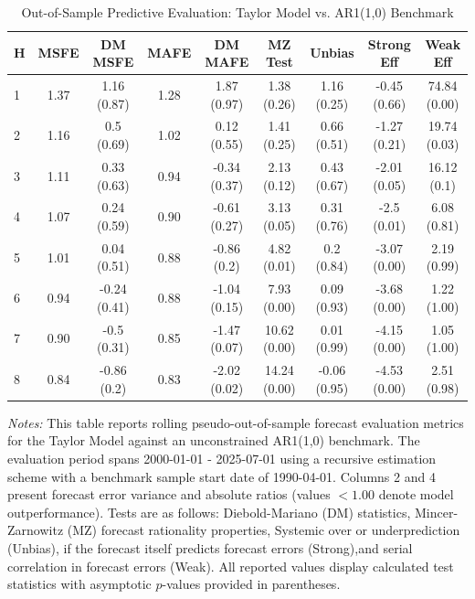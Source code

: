 \begin{table}[htbp]
\centering
\caption{Out-of-Sample Predictive Evaluation: Taylor Model vs. AR1(1,0) Benchmark}
\label{tab:taylor_model_evaluation}
\footnotesize
\begin{tabular}{l cccccccc}
\hline\hline
\rule{0pt}{3ex}
\textbf{H} & \textbf{MSFE} & \textbf{DM MSFE} & \textbf{MAFE} & \textbf{DM MAFE} & \textbf{MZ Test} & \textbf{Unbias} & \textbf{Strong Eff} & \textbf{Weak Eff} \\[0.5ex]
\hline
\rule{0pt}{2.5ex}
1 & 1.37 & 1.16 (0.87) & 1.28 & 1.87 (0.97) & 1.38 (0.26) & 1.16 (0.25) & -0.45 (0.66) & 74.84 (0.00) \\
2 & 1.16 & 0.5 (0.69) & 1.02 & 0.12 (0.55) & 1.41 (0.25) & 0.66 (0.51) & -1.27 (0.21) & 19.74 (0.03) \\
3 & 1.11 & 0.33 (0.63) & 0.94 & -0.34 (0.37) & 2.13 (0.12) & 0.43 (0.67) & -2.01 (0.05) & 16.12 (0.1) \\
4 & 1.07 & 0.24 (0.59) & 0.90 & -0.61 (0.27) & 3.13 (0.05) & 0.31 (0.76) & -2.5 (0.01) & 6.08 (0.81) \\
5 & 1.01 & 0.04 (0.51) & 0.88 & -0.86 (0.2) & 4.82 (0.01) & 0.2 (0.84) & -3.07 (0.00) & 2.19 (0.99) \\
6 & 0.94 & -0.24 (0.41) & 0.88 & -1.04 (0.15) & 7.93 (0.00) & 0.09 (0.93) & -3.68 (0.00) & 1.22 (1.00) \\
7 & 0.90 & -0.5 (0.31) & 0.85 & -1.47 (0.07) & 10.62 (0.00) & 0.01 (0.99) & -4.15 (0.00) & 1.05 (1.00) \\
8 & 0.84 & -0.86 (0.2) & 0.83 & -2.02 (0.02) & 14.24 (0.00) & -0.06 (0.95) & -4.53 (0.00) & 2.51 (0.98) \\
\hline\hline
\end{tabular}%
\par\smallskip
\parbox{\textwidth}{\scriptsize \textit{Notes:} This table reports rolling pseudo-out-of-sample forecast evaluation metrics for the Taylor Model against an unconstrained AR1(1,0) benchmark. The evaluation period spans 2000-01-01 - 2025-07-01 using a recursive estimation scheme with a benchmark sample start date of 1990-04-01. Columns 2 and 4 present forecast error variance and absolute ratios (values $< 1.00$ denote model outperformance). Tests are as follows: Diebold-Mariano (DM) statistics, Mincer-Zarnowitz (MZ) forecast rationality properties, Systemic over or underprediction (Unbias), if the forecast itself predicts forecast errors (Strong),and serial correlation in forecast errors (Weak). All reported values display calculated test statistics with asymptotic $p$-values provided in parentheses.}
\end{table}
